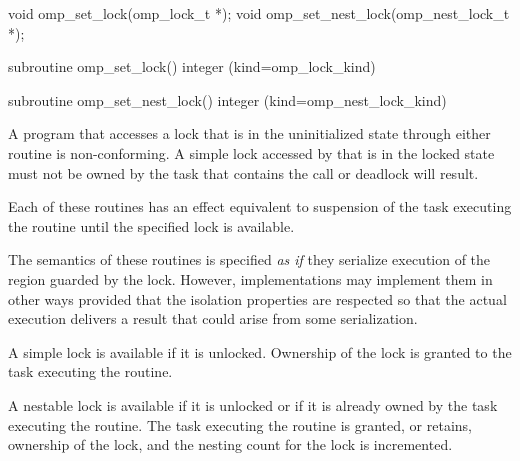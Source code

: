 \format
\begin{ccppspecific}
\begin{ompcFunction}
void omp_set_lock(omp_lock_t *);
void omp_set_nest_lock(omp_nest_lock_t *);
\end{ompcFunction}
\end{ccppspecific}

\begin{fortranspecific}
\begin{ompfSubroutine}
subroutine omp_set_lock()
integer (kind=omp_lock_kind) 

subroutine omp_set_nest_lock()
integer (kind=omp_nest_lock_kind) 
\end{ompfSubroutine}
\end{fortranspecific}

\constraints
A program that accesses a lock that is in the uninitialized state through either routine is
non-conforming. A simple lock accessed by  that is in the locked state
must not be owned by the task that contains the call or deadlock will result.

\effect
Each of these routines has an effect equivalent to suspension of the task
executing the routine until the specified lock is available.


\begin{note} The semantics of these routines is specified
\emph{as if} they serialize execution of the region guarded by the
lock. However, implementations may implement them in other ways
provided that the isolation properties are respected so that the
actual execution delivers a result that could arise from some
serialization.
\end{note}

A simple lock is available if it is unlocked. Ownership of the lock is
granted to the task executing the routine.

A nestable lock is available if it is unlocked or if it is already owned by
the task executing the routine. The task executing the routine is granted,
or retains, ownership of the lock, and the nesting count for the lock is
incremented.

